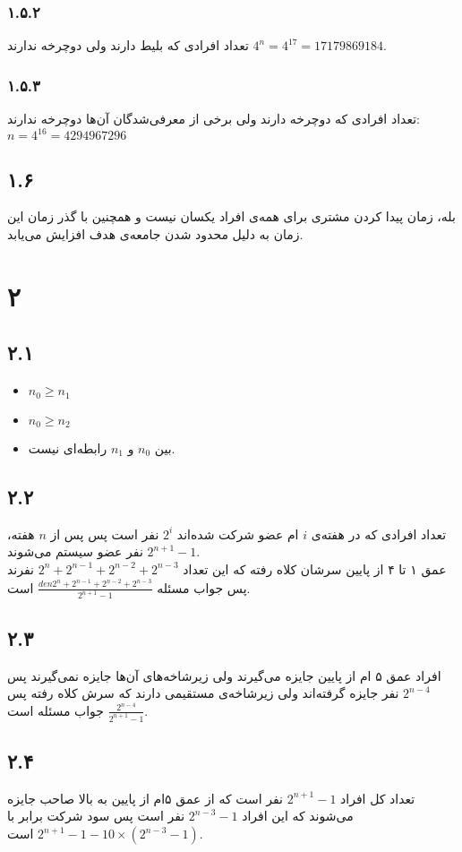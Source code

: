 \documentclass[12pt,a4paper]{article}
\begin{document}
\subsubsection*{۱.۵.۲}
تعداد افرادی که بلیط دارند ولی دوچرخه ندارند $4^n = 4^{17} = 17179869184$.
\subsubsection*{۱.۵.۳}
تعداد افرادی که دوچرخه دارند ولی برخی از معرفی‌شدگان آن‌ها دوچرخه ندارند:
$n = 4^{16} = 4294967296$
\subsection*{۱.۶}
بله، زمان پیدا کردن مشتری برای همه‌ی افراد یکسان نیست و همچنین با گذر زمان این زمان به دلیل محدود شدن جامعه‌ی هدف افزایش می‌یابد.
\section*{۲}
\subsection*{۲.۱}
\begin{itemize}
	\item $n_0 \geq n_1$
	\item $n_0 \geq n_2$
	\item بین $n_0$ و $n_1$ رابطه‌ای نیست.
\end{itemize}
\subsection*{۲.۲}
تعداد افرادی که در هفته‌ی $i$ ام عضو شرکت شده‌اند 
$2^i$
نفر است پس پس از $n$ هفته، 
$2^{n+1}-1$
نفر عضو سیستم می‌شوند.
\\
عمق ۱ تا ۴ از پایین سرشان کلاه رفته که این تعداد 
$2^n + 2^{n-1} + 2^{n-2} + 2^{n-3}$
نفرند پس جواب مسئله 
$\frac{{den}2^n + 2^{n-1} + 2^{n-2} + 2^{n-3}}{2^{n+1}-1}$
است.
\subsection*{۲.۳}
افراد عمق ۵ ام از پایین جایزه می‌گیرند ولی زیرشاخه‌های آن‌ها جایزه نمی‌گیرند پس
$2^{n-4}$
نفر جایزه گرفته‌اند ولی زیرشاخه‌ی مستقیمی دارند که سرش کلاه رفته پس 
$\frac{2^{n-4}}{2^{n+1}-1}$
جواب مسئله است.
\subsection*{۲.۴}
تعداد کل افراد $2^{n+1}-1$ نفر است که از عمق ۵ام از پایین به بالا صاحب جایزه می‌شوند که این افراد 
$2^{n-3}-1$
 نفر است پس سود شرکت برابر با
 $2^{n+1}-1 - 10\times (2^{n-3}-1)$
 است.
\end{document}
